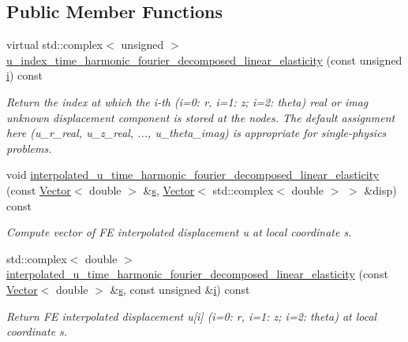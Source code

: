 \subsection*{Public Member Functions}
\begin{DoxyCompactItemize}
\item 
virtual std\+::complex$<$ unsigned $>$ \hyperlink{classoomph_1_1TimeHarmonicFourierDecomposedLinearElasticityEquationsBase_a4a526881fb74b4c41d8f5e542448e69c}{u\+\_\+index\+\_\+time\+\_\+harmonic\+\_\+fourier\+\_\+decomposed\+\_\+linear\+\_\+elasticity} (const unsigned \hyperlink{cfortran_8h_adb50e893b86b3e55e751a42eab3cba82}{i}) const
\begin{DoxyCompactList}\small\item\em Return the index at which the i-\/th (i=0\+: r, i=1\+: z; i=2\+: theta) real or imag unknown displacement component is stored at the nodes. The default assignment here (u\+\_\+r\+\_\+real, u\+\_\+z\+\_\+real, ..., u\+\_\+theta\+\_\+imag) is appropriate for single-\/physics problems. \end{DoxyCompactList}\item 
void \hyperlink{classoomph_1_1TimeHarmonicFourierDecomposedLinearElasticityEquationsBase_a01357567fa0212ff94370a78ebca67b1}{interpolated\+\_\+u\+\_\+time\+\_\+harmonic\+\_\+fourier\+\_\+decomposed\+\_\+linear\+\_\+elasticity} (const \hyperlink{classoomph_1_1Vector}{Vector}$<$ double $>$ \&\hyperlink{cfortran_8h_ab7123126e4885ef647dd9c6e3807a21c}{s}, \hyperlink{classoomph_1_1Vector}{Vector}$<$ std\+::complex$<$ double $>$ $>$ \&disp) const
\begin{DoxyCompactList}\small\item\em Compute vector of FE interpolated displacement u at local coordinate s. \end{DoxyCompactList}\item 
std\+::complex$<$ double $>$ \hyperlink{classoomph_1_1TimeHarmonicFourierDecomposedLinearElasticityEquationsBase_a0447989939b3b9a88ee060f15755c05d}{interpolated\+\_\+u\+\_\+time\+\_\+harmonic\+\_\+fourier\+\_\+decomposed\+\_\+linear\+\_\+elasticity} (const \hyperlink{classoomph_1_1Vector}{Vector}$<$ double $>$ \&\hyperlink{cfortran_8h_ab7123126e4885ef647dd9c6e3807a21c}{s}, const unsigned \&\hyperlink{cfortran_8h_adb50e893b86b3e55e751a42eab3cba82}{i}) const
\begin{DoxyCompactList}\small\item\em Return FE interpolated displacement u\mbox{[}i\mbox{]} (i=0\+: r, i=1\+: z; i=2\+: theta) at local coordinate s. \end{DoxyCompactList}\item 

\end{DoxyCompactItemize}
